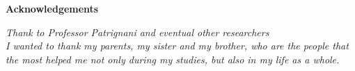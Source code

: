 \thispagestyle{empty}

\begin{center}
  {\bf \Huge Acknowledgements}
\end{center}

\vspace{4cm}
\emph{ Thank to Professor Patrignani and eventual other researchers\\I wanted to
thank my parents, my sister and my brother, who are the people that the most helped
me not only during my studies, but also in my life as a whole.\\}